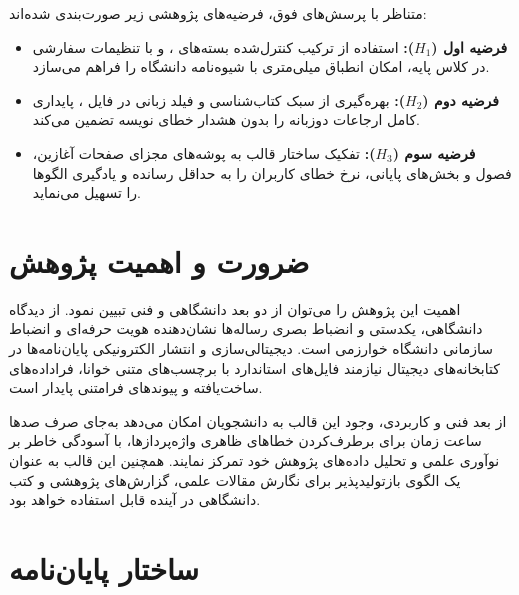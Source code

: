 متناظر با پرسش‌های فوق، فرضیه‌های پژوهشی زیر صورت‌بندی شده‌اند:
\begin{itemize}
  \item \textbf{فرضیه اول ($H_1$):} استفاده از ترکیب کنترل‌شده بسته‌های ،  و  با تنظیمات سفارشی در کلاس پایه، امکان انطباق میلی‌متری با شیوه‌نامه دانشگاه را فراهم می‌سازد.
  \item \textbf{فرضیه دوم ($H_2$):} بهره‌گیری از سبک کتاب‌شناسی  و فیلد زبانی در فایل ، پایداری کامل ارجاعات دوزبانه را بدون هشدار خطای نویسه تضمین می‌کند.
  \item \textbf{فرضیه سوم ($H_3$):} تفکیک ساختار قالب به پوشه‌های مجزای صفحات آغازین، فصول و بخش‌های پایانی، نرخ خطای کاربران را به حداقل رسانده و یادگیری الگوها را تسهیل می‌نماید.
\end{itemize}

\section{ضرورت و اهمیت پژوهش}
\label{sec:ch1_importance}

اهمیت این پژوهش را می‌توان از دو بعد دانشگاهی و فنی تبیین نمود. از دیدگاه دانشگاهی، یکدستی و انضباط بصری رساله‌ها نشان‌دهنده هویت حرفه‌ای و انضباط سازمانی دانشگاه خوارزمی است. دیجیتالی‌سازی و انتشار الکترونیکی پایان‌نامه‌ها در کتابخانه‌های دیجیتال نیازمند فایل‌های  استاندارد با برچسب‌های متنی خوانا، فراداده‌های ساخت‌یافته و پیوندهای فرامتنی پایدار است.

از بعد فنی و کاربردی، وجود این قالب به دانشجویان امکان می‌دهد به‌جای صرف صدها ساعت زمان برای برطرف‌کردن خطاهای ظاهری واژه‌پردازها، با آسودگی خاطر بر نوآوری علمی و تحلیل داده‌های پژوهش خود تمرکز نمایند. همچنین این قالب به عنوان یک الگوی بازتولیدپذیر برای نگارش مقالات علمی، گزارش‌های پژوهشی و کتب دانشگاهی در آینده قابل استفاده خواهد بود.

\section{ساختار پایان‌نامه}
\label{sec:ch1_organization}


